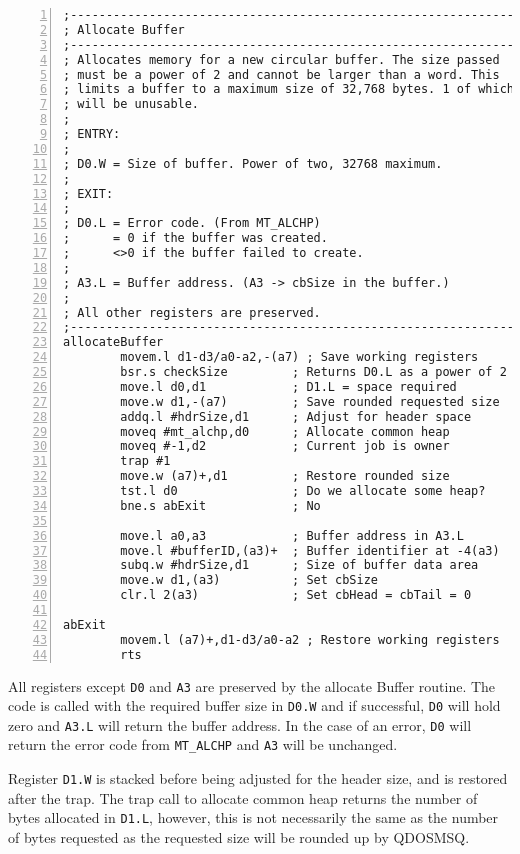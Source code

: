 \begin{lstlisting}[caption={Allocating a circular buffer},label={lis:Allocating-a-circular-buffer},numbers=left,showstringspaces=false,tabsize=4]
;--------------------------------------------------------------
; Allocate Buffer
;--------------------------------------------------------------
; Allocates memory for a new circular buffer. The size passed
; must be a power of 2 and cannot be larger than a word. This
; limits a buffer to a maximum size of 32,768 bytes. 1 of which
; will be unusable.
; 
; ENTRY:
;
; D0.W = Size of buffer. Power of two, 32768 maximum.
;
; EXIT:
;
; D0.L = Error code. (From MT_ALCHP)
;      = 0 if the buffer was created.
;      <>0 if the buffer failed to create.
;
; A3.L = Buffer address. (A3 -> cbSize in the buffer.)
;
; All other registers are preserved.
;--------------------------------------------------------------
allocateBuffer
        movem.l d1-d3/a0-a2,-(a7) ; Save working registers
		bsr.s checkSize         ; Returns D0.L as a power of 2
        move.l d0,d1            ; D1.L = space required
        move.w d1,-(a7)         ; Save rounded requested size
        addq.l #hdrSize,d1      ; Adjust for header space
        moveq #mt_alchp,d0      ; Allocate common heap
        moveq #-1,d2            ; Current job is owner
        trap #1
        move.w (a7)+,d1         ; Restore rounded size 
        tst.l d0                ; Do we allocate some heap?
        bne.s abExit            ; No       

        move.l a0,a3            ; Buffer address in A3.L
        move.l #bufferID,(a3)+  ; Buffer identifier at -4(a3)
        subq.w #hdrSize,d1      ; Size of buffer data area
        move.w d1,(a3)          ; Set cbSize 
        clr.l 2(a3)             ; Set cbHead = cbTail = 0           

abExit
        movem.l (a7)+,d1-d3/a0-a2 ; Restore working registers
        rts

\end{lstlisting}

All registers except \texttt{D0} and \texttt{A3} are preserved by
the allocate Buffer routine. The code is called with the required
buffer size in \texttt{D0.W} and if successful, \texttt{D0} will hold
zero and \texttt{A3.L} will return the buffer address. In the case
of an error, \texttt{D0} will return the error code from \texttt{MT\_ALCHP}
and \texttt{A3} will be unchanged.

Register \texttt{D1.W} is stacked before being adjusted for the header
size, and is restored after the trap. The trap call to allocate common
heap returns the number of bytes allocated in \texttt{D1.L}, however,
this is not necessarily the same as the number of bytes requested
as the requested size will be rounded up by QDOSMSQ.

